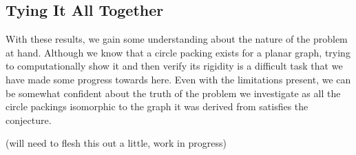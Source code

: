 \subsection{Tying It All Together}

\begin{flushleft}
With these results, we gain some understanding about the nature of the problem at hand. Although we know that a circle packing exists for a planar graph, trying to computationally show it and then verify its rigidity is a difficult task that we have made some progress towards here. Even with the limitations present, we can be somewhat confident about the truth of the problem we investigate as all the circle packings isomorphic to the graph it was derived from satisfies the conjecture. 
\end{flushleft}

\begin{flushleft}
(will need to flesh this out a little, work in progress)
\end{flushleft}